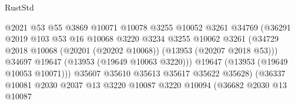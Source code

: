 \begin{lexlean}{RustStd}
\begin{coremodule}
                                            @2021
                                            @53
                                            @55
                                            @3869
                                            @10071
                                            @10078
                                            @3255
                                            @10052
                                            @3261
                                            @34769
                                            (@36291
                                              @2019
                                              @103
                                              @53
                                              @16
                                              @10068
                                              @3220
                                              @3234
                                              @3255
                                              @10062
                                              @3261
                                              (@34729
                                                @2018
                                                @10068
                                                (@20201 (@20202 @10068))
                                                (@13953 (@20207 @2018 @53)))
                                              @34697
                                              @19647
                                              (@13953 (@19649 @10063 @3220)))
                                            @19647
                                            (@13953 (@19649 @10053 @10071)))
                                          @35607
                                          @35610
                                          @35613
                                          @35617
                                          @35622
                                          @35628)
                                        (@36337
                                          @10081
                                          @2030
                                          @2037
                                          @13
                                          @3220
                                          @10087
                                          @3220
                                          @10094
                                          (@36682
                                            @2030
                                            @13
                                            @10087

\end{coremodule}
\end{lexlean}
